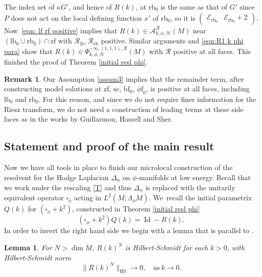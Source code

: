 \documentclass[11pt]{article}
\numberwithin{equation}{section}
\theoremstyle{plain}
\newtheorem{Lemma}[Th]{Lemma}
\theoremstyle{definition}
\newtheorem{Rem}[Th]{Remark}
\newcommand\calA{{\mathcal A}}
\newcommand\calE{{\mathcal E}}
\newcommand\calR{{\mathcal R}}
\newcommand{\phif}{{\phi\mathrm{f}}}
\newcommand{\lf}{{\mathrm{lb}}}
\newcommand{\rf}{{\mathrm{rb}}}
\newcommand{\lfz}{{\mathrm{lb}_0}}
\newcommand{\rfz}{{\mathrm{rb}_0}}
\newcommand{\bbf}{{\mathrm{bf}}}
\newcommand{\bbfz}{{\bbf_0}}
\newcommand{\ssc}{{\mathrm{sc}}}
\newcommand{\zf}{{\mathrm{zf}}}
\DeclareMathOperator{\Id}{Id}
\begin{document}
The index set of $\kappa G'$, and hence of $R(k)$, at $\rfz$ is the same as that of $G'$ since~$P$ does not act on the local defining function $x'$ of $\rfz$, so it is $
\begin{pmatrix}
\calE_\rfz & \calE_\rfz+2
\end{pmatrix}
$.
Now~\eqref{eqn: lf rf positive} implies that $R(k)\in\calA^{\calR}_{k,\phi,\mathscr{H}}(M)$ near $(\lf_0\cup\rfz)\cap\zf$ with $\calR_\lf,\calR_\rf$ positive. Similar arguments and \eqref{eqn:R1 k phi para} show that
$R(k)\in\Psi^{-\infty,(1,1,1),\calR}_{k,\phi,\mathscr{H}}(M)$ with $\calR$ positive at all faces.
This finished the proof of Theorem \ref{initial resl phi}.

\begin{Rem}
Our Assumption \ref{assum3} implies that the remainder term, after constructing model solutions at $\zf$, $\ssc$, $\bbfz$, $\phif_0$, is positive at all faces, including $\lfz$ and $\rfz$. For this reason, and since we do not require finer information for the Riesz transform, we do not need a construction of leading terms at these side faces as in the works by
Guillarmou, Hassell and Sher.
\end{Rem}

\subsection{Statement and proof of the main result} \label{section 9}
Now we have all tools in place to finish our microlocal construction of the resolvent
for the Hodge Laplacian $\Delta_{\phi}$ on $\phi$\nobreakdash-manifolds
at low energy. Recall that we work under the rescaling \eqref{T} and thus $\Delta_{\phi}$
is replaced with the unitarily equivalent operator $\square_{\phi}$ acting in $L^2(M;\Lambda_\phi M)$.
We~recall the initial parametrix $Q(k)$ for $(\square_{\phi} + k^{2})$,
constructed in Theorem \ref{initial resl phi}\vspace*{-3pt}
\[
(\square_{\phi} + k^{2}) Q(k) = \Id - R(k).
\]
In order to invert the right hand side we begin with a lemma that is parallel to
\cite[Cor.\,2.11]{guillarmou2008resolvent}.

\begin{Lemma} \label{hilbert}
For $N > \dim M$, $R(k)^{N}$ is Hilbert-Schmidt for
each $k > 0$, with Hilbert-Schmidt norm\vspace*{-3pt}\enlargethispage{\baselineskip}%
\begin{equation*}
\lVert R(k)^{N} \rVert_{\text{HS}} \to 0,
\quad \text{as} \ k \to 0.
\end{equation*}
\end{Lemma}
\end{document}
